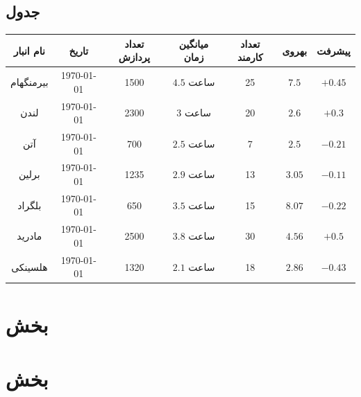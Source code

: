 \documentclass[11pt, oneside]{book}
\begin{document}
\subsection{جدول}
\begin{table}[H]
\begin{center}
\begin{adjustbox}{width=\textwidth}
\begin{tabular}{|c|c|c|c|c|c|c|}
\hline
نام انبار &
تاریخ &
تعداد پردازش &
میانگین زمان &
تعداد کارمند &
بهروی &
پیشرفت \\
\hline
\hline
بیرمنگهام &
\today &
1500 &
$4.5$ ساعت &
25 &
$7.5$ &
$+0.45$ \\
\hline
لندن &
\today &
2300 &
3 ساعت &
20 &
$2.6$ &
$+0.3$ \\
\hline
آتن &
\today &
700 &
$2.5$ ساعت &
7 &
$2.5$ &
$-0.21$ \\
\hline
برلین &
\today &
1235 &
$2.9$ ساعت &
13 &
$3.05$ &
$-0.11$ \\
\hline
بلگراد &
\today &
650 &
$3.5$ ساعت &
15 &
$8.07$ &
$-0.22$ \\
\hline
مادرید &
\today &
2500 &
$3.8$ ساعت &
30 &
$4.56$ &
$+0.5$ \\
\hline
هلسینکی &
\today &
1320 &
$2.1$ ساعت &
18 &
$2.86$ &
$-0.43$ \\
\hline
\end{tabular}
\end{adjustbox}
\end{center}
\end{table}

\section{بخش }

\section{بخش }
\end{document}
